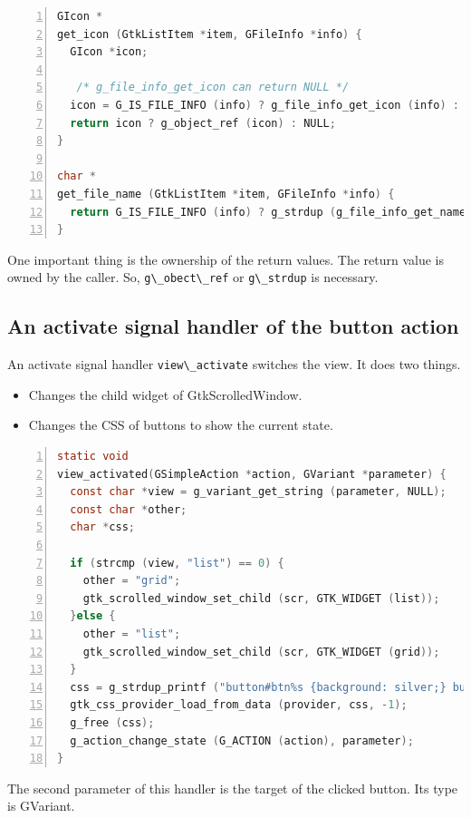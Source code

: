 \begin{lstlisting}[language=C, numbers=left]
GIcon *
get_icon (GtkListItem *item, GFileInfo *info) {
  GIcon *icon;

   /* g_file_info_get_icon can return NULL */
  icon = G_IS_FILE_INFO (info) ? g_file_info_get_icon (info) : NULL;
  return icon ? g_object_ref (icon) : NULL;
}

char *
get_file_name (GtkListItem *item, GFileInfo *info) {
  return G_IS_FILE_INFO (info) ? g_strdup (g_file_info_get_name (info)) : NULL;
}
\end{lstlisting}

One important thing is the ownership of the return values. The return
value is owned by the caller. So,
\passthrough{\lstinline!g\_obect\_ref!} or
\passthrough{\lstinline!g\_strdup!} is necessary.

\subsection{An activate signal handler of the button
action}\label{an-activate-signal-handler-of-the-button-action}

An activate signal handler \passthrough{\lstinline!view\_activate!}
switches the view. It does two things.

\begin{itemize}
\tightlist
\item
  Changes the child widget of GtkScrolledWindow.
\item
  Changes the CSS of buttons to show the current state.
\end{itemize}

\begin{lstlisting}[language=C, numbers=left]
static void
view_activated(GSimpleAction *action, GVariant *parameter) {
  const char *view = g_variant_get_string (parameter, NULL);
  const char *other;
  char *css;

  if (strcmp (view, "list") == 0) {
    other = "grid";
    gtk_scrolled_window_set_child (scr, GTK_WIDGET (list));
  }else {
    other = "list";
    gtk_scrolled_window_set_child (scr, GTK_WIDGET (grid));
  }
  css = g_strdup_printf ("button#btn%s {background: silver;} button#btn%s {background: white;}", view, other);
  gtk_css_provider_load_from_data (provider, css, -1);
  g_free (css);
  g_action_change_state (G_ACTION (action), parameter);
}
\end{lstlisting}

The second parameter of this handler is the target of the clicked
button. Its type is GVariant.

